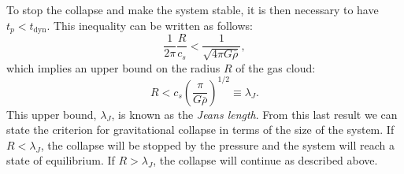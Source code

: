 \documentclass[11pt, a4paper,oneside,openright]{book}
\numberwithin{equation}{section}
\begin{document}
To stop the collapse and make the system stable, it is then necessary to have $t_p<t_{\mathrm{dyn}}$. This inequality can be written as follows:
\begin{equation}
\frac{1}{2\pi}\frac{R}{c_s}<\frac{1}{\sqrt{4\pi G \bar{\rho}}},
\end{equation}
which implies an upper bound on the radius $R$ of the gas cloud:
\begin{equation} \label{eq:jeans_def}
R< c_s\left(\frac{\pi}{G\bar{\rho}}\right)^{1/2} \equiv \lambda_J.
\end{equation}
This upper bound, $\lambda_J$, is known as the {\it Jeans length}. From this last result we can state the criterion for gravitational collapse in terms of the size of the system. If $R<\lambda_J$, the collapse will be stopped by the pressure and the system will reach a state of equilibrium. If $R>\lambda_J$, the collapse will continue as described above.
\end{document}
